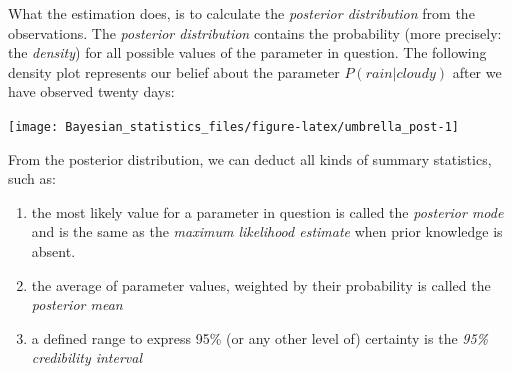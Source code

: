 \documentclass[]{svmono}
\newenvironment{Shaded}{\begin{snugshade}}{\end{snugshade}}
\newcommand{\KeywordTok}[1]{\textcolor[rgb]{0.13,0.29,0.53}{\textbf{#1}}}
\newcommand{\DataTypeTok}[1]{\textcolor[rgb]{0.13,0.29,0.53}{#1}}
\newcommand{\DecValTok}[1]{\textcolor[rgb]{0.00,0.00,0.81}{#1}}
\newcommand{\StringTok}[1]{\textcolor[rgb]{0.31,0.60,0.02}{#1}}
\newcommand{\OperatorTok}[1]{\textcolor[rgb]{0.81,0.36,0.00}{\textbf{#1}}}
\newcommand{\NormalTok}[1]{#1}
\providecommand{\tightlist}{%
  \setlength{\itemsep}{0pt}\setlength{\parskip}{0pt}}
\begin{document}
\begin{Shaded}
\end{Shaded}

What the estimation does, is to calculate the \emph{posterior
distribution} from the observations. The \emph{posterior distribution}
contains the probability (more precisely: the \emph{density}) for all
possible values of the parameter in question. The following density plot
represents our belief about the parameter \(P(rain|cloudy)\) after we
have observed twenty days:

\begin{Shaded}
\end{Shaded}

\texttt{[image: Bayesian\_statistics\_files/figure-latex/umbrella\_post-1]}

From the posterior distribution, we can deduct all kinds of summary
statistics, such as:

\begin{enumerate}
\def\labelenumi{\arabic{enumi}.}
\tightlist
\item
  the most likely value for a parameter in question is called the
  \emph{posterior mode} and is the same as the \emph{maximum likelihood
  estimate} when prior knowledge is absent.
\item
  the average of parameter values, weighted by their probability is
  called the \emph{posterior mean}
\item
  a defined range to express 95\% (or any other level of) certainty is
  the \emph{95\% credibility interval}
\end{enumerate}
\end{document}
